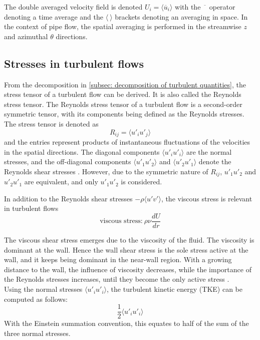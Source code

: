  The double averaged velocity field is denoted $U_i = \langle \overline{u}_i \rangle$ with the $\overline{\phantom{u}}$ operator denoting a time average and the $\langle \ \rangle$ brackets denoting an averaging in space.
In the context of pipe flow,  the spatial averaging is performed in the streamwise $z$ and azimuthal $\theta$ directions.


\subsection{Stresses in turbulent flows}\label{subsec: stresses in turbulence}
From the decomposition in \autoref{subsec: decomposition of turbulent quantities}, the stress tensor of a turbulent flow can be derived.
It is also called the Reynolds stress tensor.
The Reynolds stress tensor of a turbulent flow is a second-order symmetric tensor, with its components  being defined as  the Reynolds stresses.
The stress tensor is denoted as 
\begin{equation} \label{eq: Reynolds stresses}
     R_{ij} = \langle u'_i u'_j \rangle
\end{equation}
and the entries represent products of instantaneous fluctuations of the velocities in the spatial directions.
The diagonal components $\langle u'_iu'_i\rangle$ are the normal stresses, and the off-diagonal components $\langle u'_1 u'_2 \rangle$ and $\langle u'_2u'_1 \rangle$ denote the Reynolds shear stresses \citep{popeTurbulentFlows2015}.
However, due to the symmetric nature of $R_{ij}$, $u'_1u'_2$ and $u'_2u'_1$ are equivalent, and only $u'_1u'_2$ is considered. 

In addition to the Reynolds shear stresses $-\rho \langle u' v' \rangle$, the viscous stress is relevant in turbulent flows
\begin{equation}\label{eq: viscous stress}
    \text{viscous stress:}\ \rho \nu \frac{dU}{dr}
\end{equation}

The viscous shear stress emerges due to the viscosity of the fluid.
The viscosity is dominant at the wall. Hence the wall shear stress is the sole stress active at the wall, and it keeps being dominant in the near-wall region.
With a growing distance to the wall, the influence of viscosity decreases, while the importance of the Reynolds stresses increases, until they become the only active stress \citep{popeTurbulentFlows2015}.\\
Using the normal stresses $\langle u'_i u'_i\rangle$, the turbulent kinetic energy (TKE) can be computed as follows:
\begin{equation}\label{eq: TKE}
    \frac{1}{2} \langle u'_i u'_i\rangle
\end{equation}
With the Einstein summation convention, this equates to half of the sum of the three normal stresses. 
